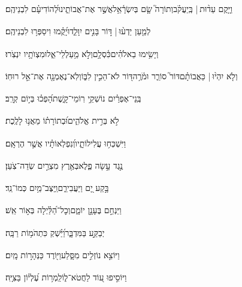\documentclass[12pt]{article}
\newcommand{\loc}[1]{\textsuperscript{\locf{#1}}}
\begin{document}
{\loc{ ה}~}‏וַיָּ֤קֶם עֵד֨וּת |  בְּֽיַעֲקֹ֗ב{\hfill}וְתוֹרָה֮ שָׂ֤ם בְּיִשְׂרָ֫אֵ֥ל\newline\hspace*{.5em}אֲשֶׁ֣ר  אֶת־אֲבוֹתֵ֑ינוּ{\hfill}לְ֝הוֹדִיעָ֗ם לִבְנֵיהֶֽם׃\par

{\loc{ ו}~}‏לְמַ֤עַן יֵדְע֨וּ |  דּ֣וֹר  בָּנִ֣ים יִוָּלֵ֑דוּ{\hfill}יָ֝קֻ֗מוּ וִיסַפְּר֥וּ לִבְנֵיהֶֽם׃\par

{\loc{ ז}~}‏וְיָשִׂ֥ימוּ בֵאלֹהִ֗ים{\hfill}כִּ֫סְלָ֥ם\newline\hspace*{.5em}וְלֹ֣א  מַ֥עַלְלֵי־אֵ֑ל{\hfill}וּמִצְוֺתָ֥יו יִנְצֹֽרוּ׃\par

{\loc{ ח}~}‏וְלֹ֤א יִהְי֨וּ |  כַּאֲבוֹתָ֗ם{\hfill}דּוֹר֮ סוֹרֵ֢ר וּמֹ֫רֶ֥ה\newline\hspace*{.5em}דּ֭וֹר לֹא־הֵכִ֣ין לִבּ֑וֹ{\hfill}וְלֹֽא־נֶאֶמְנָ֖ה אֶת־אֵ֣ל רוּחֽוֹ׃\par

{\loc{ ט}~}‏בְּֽנֵי־אֶפְרַ֗יִם נוֹשְׁקֵ֥י רֽוֹמֵי־קָ֑שֶׁת{\hfill}הָ֝פְכ֗וּ בְּי֣וֹם קְרָֽב׃\par

{\loc{ י}~}‏לֹ֣א  בְּרִ֣ית אֱלֹהִ֑ים{\hfill}וּ֝בְתוֹרָת֗וֹ מֵאֲנ֥וּ לָלֶֽכֶת׃\par

{\loc{ יא}~}‏וַיִּשְׁכְּח֥וּ עֲלִילוֹתָ֑יו{\hfill}וְ֝נִפְלְאוֹתָ֗יו אֲשֶׁ֣ר הֶרְאָֽם׃\par

{\loc{ יב}~}‏נֶ֣גֶד  עָ֣שָׂה פֶ֑לֶא{\hfill}בְּאֶ֖רֶץ מִצְרַ֣יִם שְׂדֵה־צֹֽעַן׃\par

{\loc{ יג}~}‏בָּ֣קַע יָ֭ם וַיַּעֲבִירֵ֑ם{\hfill}וַֽיַּצֶּב־מַ֥יִם כְּמוֹ־נֵֽד׃\par

{\loc{ יד}~}‏וַיַּנְחֵ֣ם בֶּעָנָ֣ן יוֹמָ֑ם{\hfill}וְכׇל־הַ֝לַּ֗יְלָה בְּא֣וֹר אֵֽשׁ׃\par

{\loc{ טו}~}‏יְבַקַּ֣ע  בַּמִּדְבָּ֑ר{\hfill}וַ֝יַּ֗שְׁקְ כִּתְהֹמ֥וֹת רַבָּֽה׃\par

{\loc{ טז}~}‏וַיּוֹצִ֣א נוֹזְלִ֣ים מִסָּ֑לַע{\hfill}וַיּ֖וֹרֶד כַּנְּהָר֣וֹת מָֽיִם׃\par

{\loc{ יז}~}‏וַיּוֹסִ֣יפוּ ע֭וֹד לַחֲטֹא־ל֑וֹ{\hfill}לַֽמְר֥וֹת עֶ֝לְי֗וֹן בַּצִּיָּֽה׃\par
\end{document}
